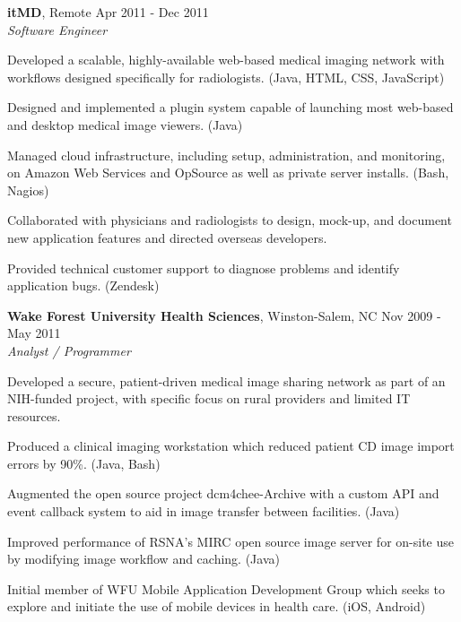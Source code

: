 \documentclass[margin,line]{resume}
\begin{document}
\begin{resume}
  \textbf{itMD}, Remote \hfill Apr 2011 - Dec 2011\vspace{1mm}\\
  \textsl{Software Engineer}\\
  \vspace{-3mm}
  \begin{list2}
\item Developed a scalable, highly-available web-based medical imaging network with workflows designed specifically for radiologists. (Java, HTML, CSS, JavaScript)
\item Designed and implemented a plugin system capable of launching most web-based and desktop medical image viewers. (Java)
\item Managed cloud infrastructure, including setup, administration, and monitoring, on Amazon Web Services and OpSource as well as private server installs. (Bash, Nagios)
\item Collaborated with physicians and radiologists to design, mock-up, and document new application features and directed overseas developers.
\item Provided technical customer support to diagnose problems and identify application bugs. (Zendesk)
  \end{list2}

  \textbf{Wake Forest University Health Sciences}, Winston-Salem, NC \hfill Nov 2009 - May 2011\vspace{1mm}\\
  \textsl{Analyst / Programmer}\\
  \vspace{-3mm}
  \begin{list2}
\item Developed a secure, patient-driven medical image sharing network as part of an NIH-funded project, with specific focus on rural providers and limited IT resources.
\item Produced a clinical imaging workstation which reduced patient CD image import errors by 90\%. (Java, Bash)
\item Augmented the open source project dcm4chee-Archive with a custom API and event callback system to aid in image transfer between facilities. (Java)
\item Improved performance of RSNA's MIRC open source image server for on-site use by modifying image workflow and caching. (Java)
\item Initial member of WFU Mobile Application Development Group which seeks to explore and initiate the use of mobile devices in health care. (iOS, Android)
  \end{list2}


\end{resume}
\end{document}
